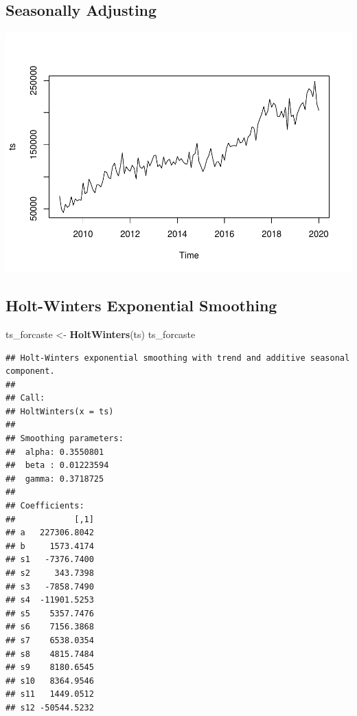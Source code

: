 \documentclass[
]{article}
\newenvironment{Shaded}{\begin{snugshade}}{\end{snugshade}}
\newcommand{\KeywordTok}[1]{\textcolor[rgb]{0.13,0.29,0.53}{\textbf{#1}}}
\newcommand{\NormalTok}[1]{#1}
\newcommand{\OperatorTok}[1]{\textcolor[rgb]{0.81,0.36,0.00}{\textbf{#1}}}
\newcommand{\StringTok}[1]{\textcolor[rgb]{0.31,0.60,0.02}{#1}}
\begin{document}
\hypertarget{seasonally-adjusting}{%
\subsection{Seasonally Adjusting}\label{seasonally-adjusting}}

\begin{Shaded}
\end{Shaded}

\includegraphics{tsf_export_files/figure-latex/unnamed-chunk-10-1.pdf}

\hypertarget{holt-winters-exponential-smoothing}{%
\subsection{Holt-Winters Exponential
Smoothing}\label{holt-winters-exponential-smoothing}}

\begin{Shaded}
\begin{Highlighting}[]
\NormalTok{ts_forcaste <-}\StringTok{ }\KeywordTok{HoltWinters}\NormalTok{(ts)}
\NormalTok{ts_forcaste}
\end{Highlighting}
\end{Shaded}

\begin{verbatim}
## Holt-Winters exponential smoothing with trend and additive seasonal component.
## 
## Call:
## HoltWinters(x = ts)
## 
## Smoothing parameters:
##  alpha: 0.3550801
##  beta : 0.01223594
##  gamma: 0.3718725
## 
## Coefficients:
##            [,1]
## a   227306.8042
## b     1573.4174
## s1   -7376.7400
## s2     343.7398
## s3   -7858.7490
## s4  -11901.5253
## s5    5357.7476
## s6    7156.3868
## s7    6538.0354
## s8    4815.7484
## s9    8180.6545
## s10   8364.9546
## s11   1449.0512
## s12 -50544.5232
\end{verbatim}
\end{document}
